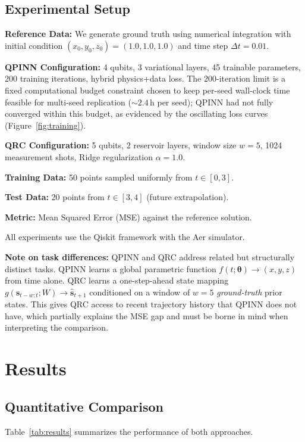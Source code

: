 \documentclass[11pt,a4paper]{article}
\begin{document}
\subsection{Experimental Setup}

\textbf{Reference Data:} We generate ground truth using numerical integration with initial condition $(x_0, y_0, z_0) = (1.0, 1.0, 1.0)$ and time step $\Delta t = 0.01$.

\textbf{QPINN Configuration:} 4 qubits, 3 variational layers, 45 trainable parameters, 200 training iterations, hybrid physics+data loss.
The 200-iteration limit is a fixed computational budget constraint chosen to keep per-seed wall-clock time feasible for multi-seed replication (${\sim}2.4$\,h per seed); QPINN had not fully converged within this budget, as evidenced by the oscillating loss curves (Figure~\ref{fig:training}).

\textbf{QRC Configuration:} 5 qubits, 2 reservoir layers, window size $w=5$, 1024 measurement shots, Ridge regularization $\alpha=1.0$.

\textbf{Training Data:} 50 points sampled uniformly from $t \in [0, 3]$.

\textbf{Test Data:} 20 points from $t \in [3, 4]$ (future extrapolation).

\textbf{Metric:} Mean Squared Error (MSE) against the reference solution.

All experiments use the Qiskit framework with the Aer simulator.

\textbf{Note on task differences:} QPINN and QRC address related but
structurally distinct tasks. QPINN learns a global parametric function
$f(t;\boldsymbol{\theta}) \rightarrow (x,y,z)$ from time alone. QRC learns a
one-step-ahead state mapping $g(\mathbf{s}_{t-w:t}; W) \rightarrow
\hat{\mathbf{s}}_{t+1}$ conditioned on a window of $w=5$ \emph{ground-truth}
prior states. This gives QRC access to recent trajectory history that QPINN
does not have, which partially explains the MSE gap and must be borne in mind
when interpreting the comparison.

\section{Results}

\subsection{Quantitative Comparison}

Table~\ref{tab:results} summarizes the performance of both approaches.
\end{document}
